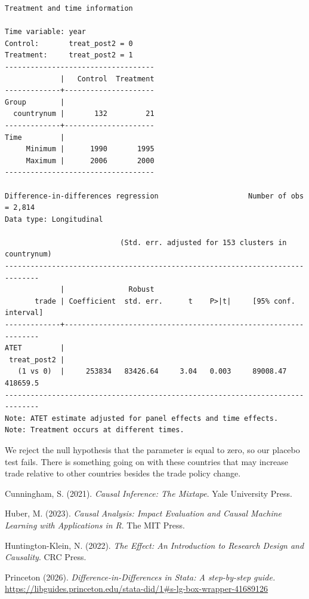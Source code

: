 \documentclass[
]{book}
\begin{document}
\begin{verbatim}
Treatment and time information

Time variable: year
Control:       treat_post2 = 0
Treatment:     treat_post2 = 1
-----------------------------------
             |   Control  Treatment
-------------+---------------------
Group        |
  countrynum |       132         21
-------------+---------------------
Time         |
     Minimum |      1990       1995
     Maximum |      2006       2000
-----------------------------------

Difference-in-differences regression                     Number of obs = 2,814
Data type: Longitudinal

                           (Std. err. adjusted for 153 clusters in countrynum)
------------------------------------------------------------------------------
             |               Robust
       trade | Coefficient  std. err.      t    P>|t|     [95% conf. interval]
-------------+----------------------------------------------------------------
ATET         |
 treat_post2 |
   (1 vs 0)  |     253834   83426.64     3.04   0.003     89008.47    418659.5
------------------------------------------------------------------------------
Note: ATET estimate adjusted for panel effects and time effects.
Note: Treatment occurs at different times.
\end{verbatim}

We reject the null hypothesis that the parameter is equal to zero, so our placebo test fails. There is something going on with these countries that may increase trade relative to other countries besides the trade policy change.

Cunningham, S. (2021). \emph{Causal Inference: The Mixtape}. Yale University Press.

Huber, M. (2023). \emph{Causal Analysis: Impact Evaluation and Causal Machine Learning with Applications in R}. The MIT Press.

Huntington-Klein, N. (2022). \emph{The Effect: An Introduction to Research Design and Causality}. CRC Press.

Princeton (2026). \emph{Difference-in-Differences in Stata: A step-by-step guide.} \url{https://libguides.princeton.edu/stata-did/1\#s-lg-box-wrapper-41689126}


\end{document}
